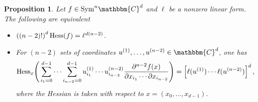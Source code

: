 \documentclass[aps,floatfix,groupedaddress,superscriptaddress,longbibliography,footinbib,notitlepage,showpacs]{revtex4-1}
\def\Hess{{\rm Hess}}
\newtheorem{proposition}[theorem]{Proposition}
\begin{document}
\begin{proposition}\label{prop:aaprime}
Let $f\in \mathrm{Sym}^n\mathbbm{C}^d$ and $\ell$ be a nonzero linear form.  The following are equivalent
\begin{itemize}
\item[$(\textnormal{a})$] $\left((n-2)!\right)^d\Hess(f)=\ell^{d(n-2)}$.
\item[$(\textnormal{a}^{\prime})$] For $(n-2)$ sets of coordinates $u^{(1)},\ldots, u^{(n-2)}\in\mathbbm{C}^d$, one has
\begin{equation}\label{eq:hessxl}
\Hess_x\Bigg(\sum_{i_1=0}^{d-1}\cdots\sum_{i_{n-2}=0}^{d-1} u^{(1)}_{i_1}\cdots u^{(n-2)}_{i_{n-2}}
\frac{\partial^{n-2}f(x)}{\partial x_{i_1}\cdots\partial {x_{i_{n-2}}}}\Bigg) = \Big[\ell(u^{(1)})\cdots \ell(u^{(n-2)})\Big]^d\,,
\end{equation}
 where the Hessian is taken with respect to $x=(x_0,\ldots, x_{d-1})$.
\end{itemize}
\end{proposition}
\end{document}
